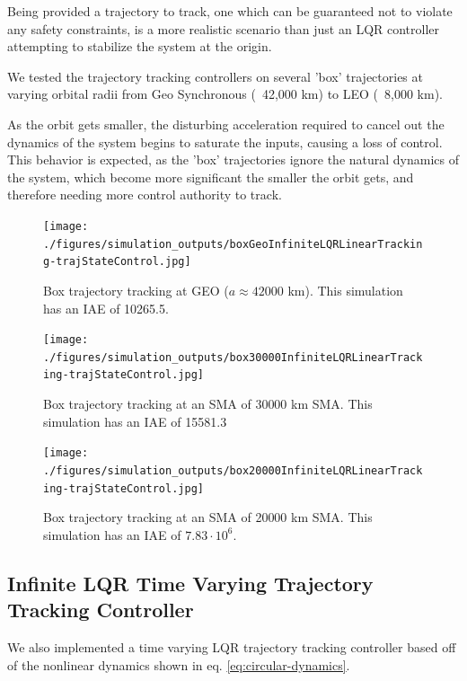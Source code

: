\documentclass[conference]{IEEEtran}
\begin{document}
Being provided a trajectory to track, one which can be guaranteed not to
violate any safety constraints, is a more realistic scenario than just an LQR
controller attempting to stabilize the system at the origin.

We tested the trajectory tracking controllers on several 'box' trajectories at
varying orbital radii from Geo Synchronous (~42,000 km) to LEO (~8,000 km).

As the orbit gets smaller, the disturbing acceleration required to cancel out
the dynamics of the system begins to saturate the inputs, causing a loss of
control. This behavior is expected, as the 'box' trajectories ignore the
natural dynamics of the system, which become more significant the smaller the
orbit gets, and therefore needing more control authority to track.

\begin{figure}[t]
    \centerline{\texttt{[image: ./figures/simulation\_outputs/boxGeoInfiniteLQRLinearTracking-trajStateControl.jpg]}}
    \caption{Box trajectory tracking at GEO ($a \approx 42000$ km). This
    simulation has an IAE of 10265.5.}
    \label{fig:boxGEO}
\end{figure}

\begin{figure}[t]
    \centerline{\texttt{[image: ./figures/simulation\_outputs/box30000InfiniteLQRLinearTracking-trajStateControl.jpg]}}
    \caption{Box trajectory tracking at an SMA of 30000 km SMA. This simulation
    has an IAE of 15581.3}
    \label{fig:box30000}
\end{figure}

\begin{figure}[t]
    \centerline{\texttt{[image: ./figures/simulation\_outputs/box20000InfiniteLQRLinearTracking-trajStateControl.jpg]}}
    \caption{Box trajectory tracking at an SMA of 20000 km SMA. This simulation
    has an IAE of $7.83\cdot10^6$.}
    \label{fig:box2000}
\end{figure}


\subsection{Infinite LQR Time Varying Trajectory Tracking Controller}

We also implemented a time varying LQR trajectory tracking controller based off
of the nonlinear dynamics shown in eq. \ref{eq:circular-dynamics}.
\end{document}
